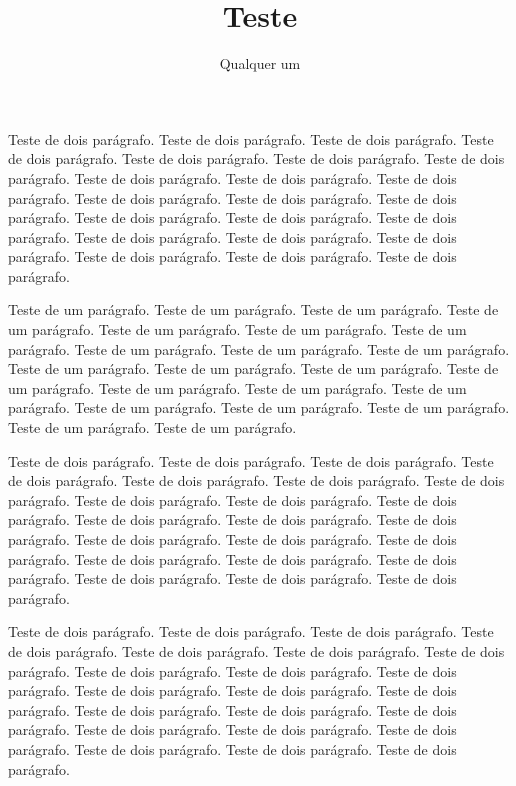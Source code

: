 \documentclass[12pt]{article}
\title{Teste}
\author{Qualquer um}
\begin{document}
\maketitle


Teste de dois parágrafo. Teste de dois parágrafo. Teste de dois parágrafo. Teste de dois parágrafo. Teste de dois parágrafo. Teste de dois parágrafo. Teste de dois parágrafo. Teste de dois parágrafo. Teste de dois parágrafo. Teste de dois parágrafo. Teste de dois parágrafo. Teste de dois parágrafo. Teste de dois parágrafo. Teste de dois parágrafo. Teste de dois parágrafo. Teste de dois parágrafo. Teste de dois parágrafo. Teste de dois parágrafo. Teste de dois parágrafo. Teste de dois parágrafo. Teste de dois parágrafo. Teste de dois parágrafo.

Teste de um parágrafo. Teste de um parágrafo. Teste de um parágrafo. Teste de um parágrafo. Teste de um parágrafo. Teste de um parágrafo. Teste de um parágrafo. Teste de um parágrafo. Teste de um parágrafo. Teste de um parágrafo. Teste de um parágrafo. Teste de um parágrafo. Teste de um parágrafo. Teste de um parágrafo. Teste de um parágrafo. Teste de um parágrafo. Teste de um parágrafo. Teste de um parágrafo. Teste de um parágrafo. Teste de um parágrafo. Teste de um parágrafo. Teste de um parágrafo.

Teste de dois parágrafo. Teste de dois parágrafo. Teste de dois parágrafo. Teste de dois parágrafo. Teste de dois parágrafo. Teste de dois parágrafo. Teste de dois parágrafo. Teste de dois parágrafo. Teste de dois parágrafo. Teste de dois parágrafo. Teste de dois parágrafo. Teste de dois parágrafo. Teste de dois parágrafo. Teste de dois parágrafo. Teste de dois parágrafo. Teste de dois parágrafo. Teste de dois parágrafo. Teste de dois parágrafo. Teste de dois parágrafo. Teste de dois parágrafo. Teste de dois parágrafo. Teste de dois parágrafo.

Teste de dois parágrafo. Teste de dois parágrafo. Teste de dois parágrafo. Teste de dois parágrafo. Teste de dois parágrafo. Teste de dois parágrafo. Teste de dois parágrafo. Teste de dois parágrafo. Teste de dois parágrafo. Teste de dois parágrafo. Teste de dois parágrafo. Teste de dois parágrafo. Teste de dois parágrafo. Teste de dois parágrafo. Teste de dois parágrafo. Teste de dois parágrafo. Teste de dois parágrafo. Teste de dois parágrafo. Teste de dois parágrafo. Teste de dois parágrafo. Teste de dois parágrafo. Teste de dois parágrafo.
\end{document}
